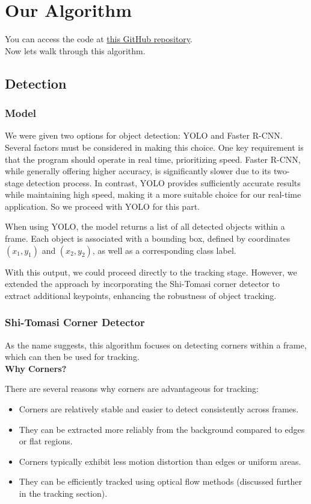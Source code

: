 \documentclass[a4paper,12pt]{article}
\begin{document}
\section{Our Algorithm}

You can access the code at \href{https://github.com/amirali83/Signal_Project_2025/blob/main/Codes/Ours/final}{this GitHub repository}. \\
Now lets walk through this algorithm.

\subsection{Detection}
\subsubsection{Model}

We were given two options for object detection: YOLO and Faster R-CNN. 
Several factors must be considered in making this choice. One key requirement is that the program should operate in real time, prioritizing speed. 
Faster R-CNN, while generally offering higher accuracy, is significantly slower due to its two-stage detection process. In contrast, YOLO provides sufficiently accurate results while maintaining high speed, 
making it a more suitable choice for our real-time application.
So we proceed with YOLO for this part.

When using YOLO, the model returns a list of all detected objects within a frame. Each object is associated with a bounding box, defined by coordinates $(x_1, y_1)$ and $(x_2, y_2)$, as well as a corresponding class label. 

With this output, we could proceed directly to the tracking stage. However, we extended the approach by incorporating the Shi-Tomasi corner detector to extract additional keypoints, enhancing the robustness of object tracking.

\subsubsection{Shi-Tomasi Corner Detector}

As the name suggests, this algorithm focuses on detecting corners within a frame, which can then be used for tracking. \\[0.5cm]
\textbf{Why Corners?}

There are several reasons why corners are advantageous for tracking:

\begin{itemize}
    \item Corners are relatively stable and easier to detect consistently across frames.
    \item They can be extracted more reliably from the background compared to edges or flat regions.
    \item Corners typically exhibit less motion distortion than edges or uniform areas.
    \item They can be efficiently tracked using optical flow methods (discussed further in the tracking section).
\end{itemize}
\end{document}
